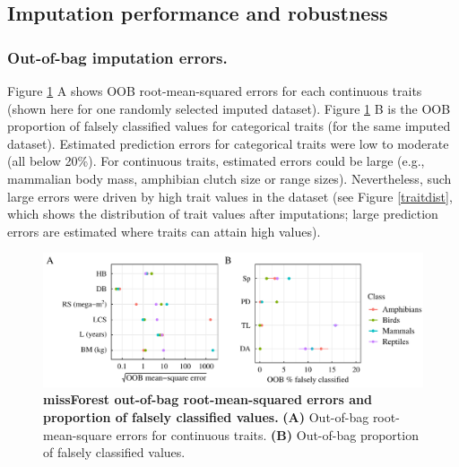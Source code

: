 \subsection{Imputation performance and robustness}

\subsubsection{Out-of-bag imputation errors.}
Figure \ref{OOBerrors} A shows OOB root-mean-squared errors for each continuous traits (shown here for one randomly selected imputed dataset). Figure \ref{OOBerrors} B is the OOB proportion of falsely classified values for categorical traits (for the same imputed dataset).
Estimated prediction errors for categorical traits were low to moderate (all below 20\%). For continuous traits, estimated errors could be large (e.g., mammalian body mass, amphibian clutch size  or range sizes). Nevertheless, such large errors were driven by high trait values in the dataset (see Figure \ref{traitdist}, which shows the distribution of trait values after imputations; large prediction errors are estimated where traits can attain high values). 
 
\begin{figure}[h!]
\centering
\includegraphics[scale=0.75]{figures/chapter2/Imputation_errors/MSE_PFC}
\caption[missForest out-of-bag root-mean-square errors and proportion of falsely classified values]{\textbf{missForest out-of-bag root-mean-squared errors and proportion of falsely classified values.} \textbf{(A)} Out-of-bag root-mean-square errors for continuous traits. \textbf{(B)} Out-of-bag proportion of falsely classified values.}
\label{OOBerrors}
\end{figure}

